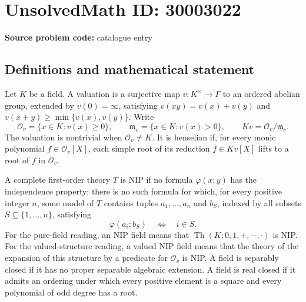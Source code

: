 \documentclass[11pt]{article}
\begin{document}
\section*{UnsolvedMath ID: 30003022}
\textbf{Source problem code:} catalogue entry
\subsection{Definitions and mathematical statement}
Let \(K\) be a field. A valuation is a surjective map \(v:K^{\times}\to\Gamma\) to an ordered abelian group, extended by \(v(0)=\infty\), satisfying \(v(xy)=v(x)+v(y)\) and \(v(x+y)\geq\min\{v(x),v(y)\}\). Write
\[
\mathcal O_v=\{x\in K:v(x)\geq0\},\qquad
\mathfrak m_v=\{x\in K:v(x)>0\},\qquad
Kv=\mathcal O_v/\mathfrak m_v.
\]
The valuation is nontrivial when \(\mathcal O_v\ne K\). It is henselian if, for every monic polynomial \(f\in\mathcal O_v[X]\), each simple root of its reduction \(\overline f\in Kv[X]\) lifts to a root of \(f\) in \(\mathcal O_v\).

A complete first-order theory \(T\) is NIP if no formula \(\varphi(x;y)\) has the independence property: there is no such formula for which, for every positive integer \(n\), some model of \(T\) contains tuples \(a_1,\ldots,a_n\) and \(b_S\), indexed by all subsets \(S\subseteq\{1,\ldots,n\}\), satisfying
\[
\varphi(a_i;b_S)\quad\Longleftrightarrow\quad i\in S.
\]
For the pure-field reading, an NIP field means that \(\operatorname{Th}(K;0,1,+,-,\cdot)\) is NIP. For the valued-structure reading, a valued NIP field means that the theory of the expansion of this structure by a predicate for \(\mathcal O_v\) is NIP. A field is separably closed if it has no proper separable algebraic extension. A field is real closed if it admits an ordering under which every positive element is a square and every polynomial of odd degree has a root.
\end{document}
